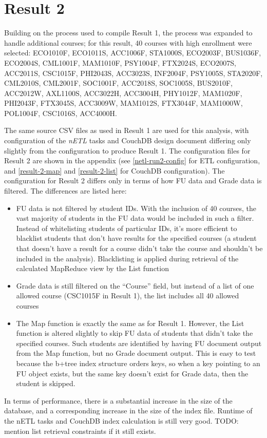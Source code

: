 \section{Result 2}
Building on the process used to compile Result 1, the process was expanded to handle additional courses; for this result, 40 courses with high enrollment were selected: ECO1010F, ECO1011S, ACC1006F, STA1000S, ECO2003F, BUS1036F, ECO2004S, CML1001F, MAM1010F, PSY1004F, FTX2024S, ECO2007S, ACC2011S, CSC1015F, PHI2043S, ACC3023S, INF2004F, PSY1005S, STA2020F, CML2010S, CML2001F, SOC1001F, ACC2018S, SOC1005S, BUS2010F, ACC2012W, AXL1100S, ACC3022H, ACC3004H, PHY1012F, MAM1020F, PHI2043F, FTX3045S, ACC3009W, MAM1012S, FTX3044F, MAM1000W, POL1004F, CSC1016S, ACC4000H.

The same source CSV files as used in Result 1 are used for this analysis, with configuration of the \textit{nETL} tasks and CouchDB design document differing only slightly from the configuration to produce Result 1. The configuration files for Result 2 are shown in the appendix (see \ref{netl-run2-config} for ETL configuration, and \ref{result-2-map} and \ref{result-2-list} for CouchDB configuration). The configuration for Result 2 differs only in terms of how FU data and Grade data is filtered. The differences are listed here:

\begin{itemize}
    \item FU data is not filtered by student IDs. With the inclusion of 40 courses, the vast majority of students in the FU data would be included in such a filter. Instead of whitelisting students of particular IDs, it's more efficient to blacklist students that don't have results for the specified courses (a student that doesn't have a result for a course didn't take the course and shouldn't be included in the analysis). Blacklisting is applied during retrieval of the calculated MapReduce view by the List function
    \item Grade data is still filtered on the ``Course'' field, but instead of a list of one allowed course (CSC1015F in Result 1), the list includes all 40 allowed courses
    \item The Map function is exactly the same as for Result 1. However, the List function is altered slightly to skip FU data of students that didn't take the specified courses. Such students are identified by having FU document output from the Map function, but no Grade document output. This is easy to test because the b+tree index structure orders keys, so when a key pointing to an FU object exists, but the same key doesn't exist for Grade data, then the student is skipped.
\end{itemize}

In terms of performance, there is a substantial increase in the size of the database, and a corresponding increase in the size of the index file. Runtime of the nETL tasks and CouchDB index calculation is still very good. TODO: mention list retrieval constraints if it still exists.